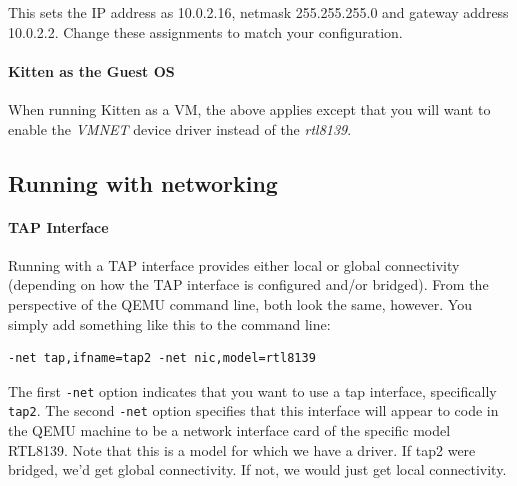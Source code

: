 \documentclass[11pt]{article}
\begin{document}
This sets the IP address as 10.0.2.16, netmask 255.255.255.0 and
gateway address 10.0.2.2. Change these assignments to match your configuration.


\paragraph*{Kitten as the Guest OS}

When running Kitten as a VM, the above applies except that you will
want to enable the {\em VMNET} device driver instead of the {\em rtl8139}.


\subsection{Running with networking}

\paragraph*{TAP Interface}
Running with a TAP interface provides either local or global
connectivity (depending on how the TAP interface is configured and/or
bridged).  From the perspective of the QEMU command line, both look
the same, however.  You simply add something like this to the command
line:
\begin{verbatim}
-net tap,ifname=tap2 -net nic,model=rtl8139
\end{verbatim}
The first \verb.-net. option indicates that you want to use a tap
interface, specifically \verb.tap2..   The second \verb.-net. option
specifies that this interface will appear to code in the QEMU machine
to be a network interface card of the specific model RTL8139.  Note
that this is a model for which we have a driver.  If tap2 were
bridged, we'd get global connectivity.  If not, we would just get
local connectivity.  
\end{document}
